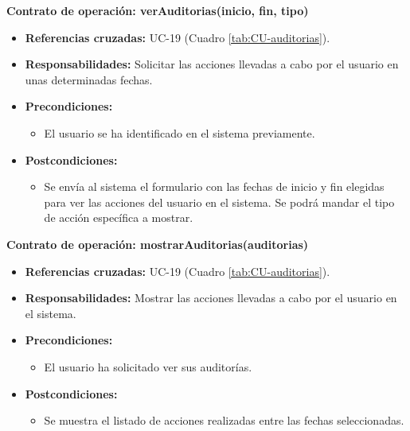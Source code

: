 \textbf{Contrato de operación: verAuditorias(inicio, fin, tipo)}
\begin{itemize}
\item \textbf{Referencias cruzadas:} UC-19 (Cuadro \ref{tab:CU-auditorias}).
\item \textbf{Responsabilidades:} Solicitar las acciones llevadas a cabo por el usuario en unas determinadas fechas.
\item \textbf{Precondiciones:} 
 \begin{itemize}
\item El usuario se ha identificado en el sistema previamente.
\end {itemize}
\item \textbf{Postcondiciones:} 
 \begin{itemize}
\item Se envía al sistema el formulario con las fechas de inicio y fin elegidas para ver las acciones del usuario en el sistema. Se podrá mandar el tipo de acción específica a mostrar.
\end {itemize}
\end {itemize}

\textbf{Contrato de operación: mostrarAuditorias(auditorias)}
\begin{itemize}
\item \textbf{Referencias cruzadas:} UC-19 (Cuadro \ref{tab:CU-auditorias}).
\item \textbf{Responsabilidades:} Mostrar las acciones llevadas a cabo por el usuario en el sistema.
\item \textbf{Precondiciones:} 
 \begin{itemize}
\item El usuario ha solicitado ver sus auditorías.
\end {itemize}
\item \textbf{Postcondiciones:} 
 \begin{itemize}
\item Se muestra el listado de acciones realizadas entre las fechas seleccionadas.
\end {itemize}
\end {itemize}


\vspace{10mm}

